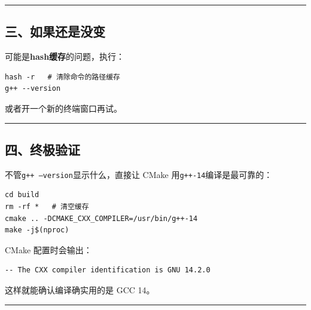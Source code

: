 \documentclass[11pt, a4paper]{article}
\begin{document}
\begin{aibox}
\begin{center}\rule{\textwidth}{0.4pt}\end{center}

\subsection*{三、如果还是没变}

可能是\textbf{hash缓存}的问题，执行：

\begin{tcolorbox}[colback=white,colframe=gray!50!white,boxrule=0.5pt,arc=2pt,left=5pt,right=5pt,top=5pt,bottom=5pt]
\begin{verbatim}
hash -r   # 清除命令的路径缓存
g++ --version
\end{verbatim}
\end{tcolorbox}

或者开一个新的终端窗口再试。

\begin{center}\rule{\textwidth}{0.4pt}\end{center}

\subsection*{四、终极验证}

不管\texttt{g++ --version}显示什么，直接让 CMake 用\texttt{g++-14}编译是最可靠的：

\begin{tcolorbox}[colback=white,colframe=gray!50!white,boxrule=0.5pt,arc=2pt,left=5pt,right=5pt,top=5pt,bottom=5pt]
\begin{verbatim}
cd build
rm -rf *   # 清空缓存
cmake .. -DCMAKE_CXX_COMPILER=/usr/bin/g++-14
make -j$(nproc)
\end{verbatim}
\end{tcolorbox}

CMake 配置时会输出：
\begin{tcolorbox}[colback=white,colframe=gray!50!white,boxrule=0.5pt,arc=2pt,left=5pt,right=5pt,top=5pt,bottom=5pt]
\begin{verbatim}
-- The CXX compiler identification is GNU 14.2.0
\end{verbatim}
\end{tcolorbox}

这样就能确认编译确实用的是 GCC 14。

\begin{center}\rule{\textwidth}{0.4pt}\end{center}


\end{aibox}
\end{document}
